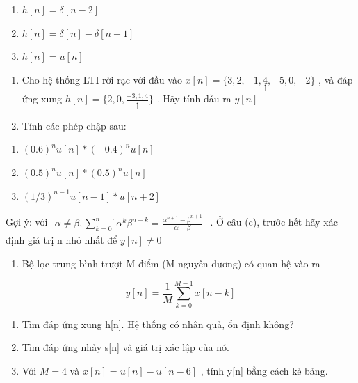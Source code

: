 \documentclass[
  10
]{article}
\providecommand{\tightlist}{%
  \setlength{\itemsep}{0pt}\setlength{\parskip}{0pt}}
\begin{document}
\begin{enumerate}
\def\labelenumi{(\alph{enumi})}
\item
  \(h [ n ] = \delta [ n - 2 ]\)
\item
  \(h [ n ] = \delta [ n ] - \delta [ n - 1 ]\)
\item
  \(h [ n ] = u [ n ]\)
\end{enumerate}

\begin{enumerate}
\def\labelenumi{\arabic{enumi}.}
\setcounter{enumi}{1}
\item
  Cho hệ thống LTI rời rạc với đầu vào
  \(x [ n ] = \{ 3 , 2 , - 1 , \underset { \uparrow } { 4 } , - 5 , 0 , - 2 \}\)
  , và đáp ứng xung
  \(h [ n ] = \{ 2 , 0 , \frac { - 3 , 1 , 4 } { \uparrow } \}\) . Hãy
  tính đầu ra \(y [ n ]\)
\item
  Tính các phép chập sau:
\end{enumerate}

\begin{enumerate}
\def\labelenumi{(\alph{enumi})}
\item
  \(( 0 . 6 ) ^ { n } u [ n ] * ( - 0 . 4 ) ^ { n } u [ n ]\)
\item
  \(( 0 . 5 ) ^ { n } u [ n ] * ( 0 . 5 ) ^ { n } u [ n ]\)
\item
  \(( 1 / 3 ) ^ { n - 1 } u [ n - 1 ] * u [ n + 2 ]\)
\end{enumerate}

Gợi ý: với
\(\begin{array} { r } { \alpha \stackrel { . } { \neq } \beta , \stackrel { . } { \sum _ { k = 0 } ^ { n } } \alpha ^ { k } \beta ^ { n - k } = \frac { \alpha ^ { n + 1 } - \beta ^ { n + 1 } } { \alpha - \beta } } \end{array}\)
. Ở câu (c), trước hết hãy xác định giá trị n nhỏ nhất để
\(y [ n ] \neq 0\)

\begin{enumerate}
\def\labelenumi{\arabic{enumi}.}
\setcounter{enumi}{3}
\tightlist
\item
  Bộ lọc trung bình trượt M điểm (M nguyên dương) có quan hệ vào ra
\end{enumerate}

\[
y [ n ] = \frac {1}{M} \sum_ {k = 0} ^ {M - 1} x [ n - k ]
\]

\begin{enumerate}
\def\labelenumi{(\alph{enumi})}
\item
  Tìm đáp ứng xung h{[}n{]}. Hệ thống có nhân quả, ổn định không?
\item
  Tìm đáp ứng nhảy s{[}n{]} và giá trị xác lập của nó.
\item
  Với \(M = 4\) và \(x [ n ] = u [ n ] - u [ n - 6 ]\) , tính y{[}n{]}
  bằng cách kẻ bảng.
\end{enumerate}
\end{document}
